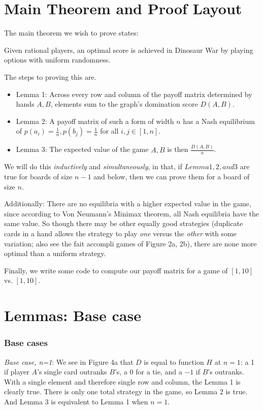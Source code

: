 \documentclass[11pt, oneside]{article} 	%
\begin{document}
\section{Main Theorem and Proof Layout}

The main theorem we wish to prove states:

\begin{framed}
Given rational players, an optimal score is achieved in Dinosaur War by playing options with uniform randomness.
\end{framed}

The steps to proving this are.

\begin{itemize}
\item Lemma 1: Across every row and column of the payoff matrix determined by hands $A, B$, elements sum to the graph's domination score $D(A,B)$.
\item Lemma 2: A payoff matrix of such a form of width $n$ has a Nash equilibrium\cite{2} of $p(a_i) = \frac{1}{n}, p(b_j) = \frac{1}{n}$ for all $i, j \in [1,n]$.
\item Lemma 3: The expected value of the game $A, B$ is then $\frac{D(A,B)}{n}$.
\end{itemize}

We will do this \emph{inductively} and \emph{simultaneously}, in that, if $Lemma 1, 2, and 3$ are true for boards of size $n-1$ and below, then we can prove them for a board of size $n$.

Additionally: There are no equilibria with a higher expected value in the game, since according to Von Neumann's Minimax theorem\cite{3}, all Nash equilibria have the same value.  So though there may be other equally good strategies (duplicate cards in a hand allows the strategy to play \emph{one} versus the \emph{other}  with some variation; also see the fait accompli games of Figure 2a, 2b), there are none more optimal than a uniform strategy.


Finally, we write some code to compute our payoff matrix for a game of $[1,10]$ vs. $[1,10]$.

\section{Lemmas: Base case}

\subsubsection{Base cases} 
\emph{Base case, n=1}: We see in Figure 4a that $D$ is equal to function $H$ at $n=1$: a 1 if player $A$'s single card outranks $B$'s, a 0 for a tie, and a $-1$ if $B$'s outranks.  With a single element and therefore single row and column, the Lemma 1 is clearly true.  There is only one total strategy in the game, so Lemma 2 is true.  And Lemma 3 is equivalent to Lemma 1 when $n=1$.
\end{document}
